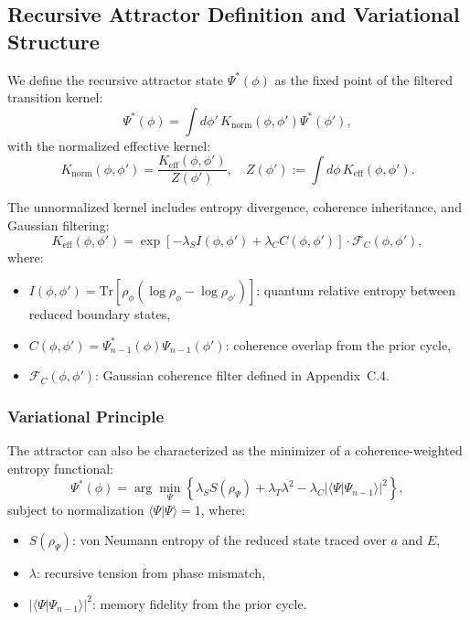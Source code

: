 \subsection*{Recursive Attractor Definition and Variational Structure}
\label{appendix:C7}

We define the recursive attractor state \( \Psi^*(\phi) \) as the fixed point of the filtered transition kernel:
\begin{equation}
\Psi^*(\phi) = \int d\phi' \, K_{\text{norm}}(\phi, \phi') \Psi^*(\phi'),
\end{equation}
with the normalized effective kernel:
\begin{equation}
K_{\text{norm}}(\phi, \phi') = \frac{K_{\text{eff}}(\phi, \phi')}{Z(\phi')}, \quad Z(\phi') := \int d\phi \, K_{\text{eff}}(\phi, \phi').
\end{equation}

The unnormalized kernel includes entropy divergence, coherence inheritance, and Gaussian filtering:
\begin{equation}
K_{\text{eff}}(\phi, \phi') = \exp\left[-\lambda_S I(\phi, \phi') + \lambda_C C(\phi, \phi') \right] \cdot \mathcal{F}_C(\phi, \phi'),
\end{equation}
where:
\begin{itemize}
  \item \( I(\phi, \phi') = \mathrm{Tr}[\rho_\phi (\log \rho_\phi - \log \rho_{\phi'})] \): quantum relative entropy between reduced boundary states,
  \item \( C(\phi, \phi') = \Psi_{n-1}^*(\phi) \Psi_{n-1}(\phi') \): coherence overlap from the prior cycle,
  \item \( \mathcal{F}_C(\phi, \phi') \): Gaussian coherence filter defined in Appendix~C.4.
\end{itemize}

\subsubsection*{Variational Principle}

The attractor can also be characterized as the minimizer of a coherence-weighted entropy functional:
\begin{equation}
\Psi^*(\phi) = \arg\min_{\Psi} \left\{ \lambda_S S(\rho_\Psi) + \lambda_T \lambda^2 - \lambda_C |\langle \Psi | \Psi_{n-1} \rangle|^2 \right\},
\end{equation}
subject to normalization \( \langle \Psi | \Psi \rangle = 1 \), where:
\begin{itemize}
  \item \( S(\rho_\Psi) \): von Neumann entropy of the reduced state traced over \( a \) and \( E \),
  \item \( \lambda \): recursive tension from phase mismatch,
  \item \( |\langle \Psi | \Psi_{n-1} \rangle|^2 \): memory fidelity from the prior cycle.
\end{itemize}

